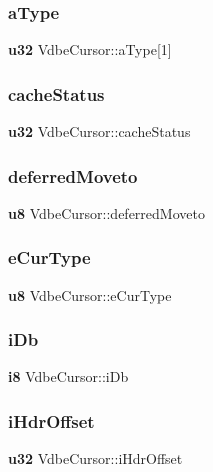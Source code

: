 \mbox{\label{struct_vdbe_cursor_aa4a4b02d8b0276a413f1191382469141}} 
\subsubsection{aType}
{\footnotesize\ttfamily \textbf{ u32} Vdbe\+Cursor\+::a\+Type[1]}

\mbox{\label{struct_vdbe_cursor_acf243b5a94a6e5a11341d6fece473c00}} 
\subsubsection{cacheStatus}
{\footnotesize\ttfamily \textbf{ u32} Vdbe\+Cursor\+::cache\+Status}

\mbox{\label{struct_vdbe_cursor_ad6c9d21da881287364a1a3f90285a7e9}} 
\subsubsection{deferredMoveto}
{\footnotesize\ttfamily \textbf{ u8} Vdbe\+Cursor\+::deferred\+Moveto}

\mbox{\label{struct_vdbe_cursor_a6128af438b1faa2d175eeb754af1a9c2}} 
\subsubsection{eCurType}
{\footnotesize\ttfamily \textbf{ u8} Vdbe\+Cursor\+::e\+Cur\+Type}

\mbox{\label{struct_vdbe_cursor_ace3e5ef31acdc9bca7b080da2af493a1}} 
\subsubsection{iDb}
{\footnotesize\ttfamily \textbf{ i8} Vdbe\+Cursor\+::i\+Db}

\mbox{\label{struct_vdbe_cursor_a838b93338c0a8539e28697e291c83a91}} 
\subsubsection{iHdrOffset}
{\footnotesize\ttfamily \textbf{ u32} Vdbe\+Cursor\+::i\+Hdr\+Offset}

